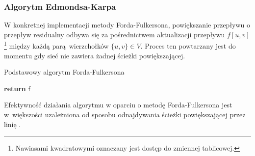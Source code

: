 \subsubsection{\textbf{Algorytm Edmondsa-Karpa}}\label{sss_edmonds_karp}
W konkretnej implementacji metody Forda-Fulkersona, powiększanie przepływu o przepływ residualny odbywa się za pośrednictwem aktualizacji przepływu $f[u,v]$\footnote{Nawiasami kwadratowymi oznaczany jest dostęp do zmiennej tablicowej.} między każdą parą wierzchołków $\{u,v\} \in V$.
Proces ten powtarzany jest do momentu gdy sieć nie zawiera żadnej ścieżki powiększającej.
\par{
  \begin{algorithm}
    \caption{Podstawowy algorytm Forda-Fulkersona}\label{alg_fordFulkersonConcrete}
    \begin{algorithmic}[1]




        \EndFor
        \label{shortestPath}


          \EndFor
        \EndWhile
        \State\textbf{return} f
      \EndFunction
    \end{algorithmic}
  \end{algorithm}
  Efektywność działania algorytmu w oparciu o metodę Forda-Fulkersona jest w~większości uzależniona od sposobu odnajdywania ścieżki powiększającej przez linię .
  }
